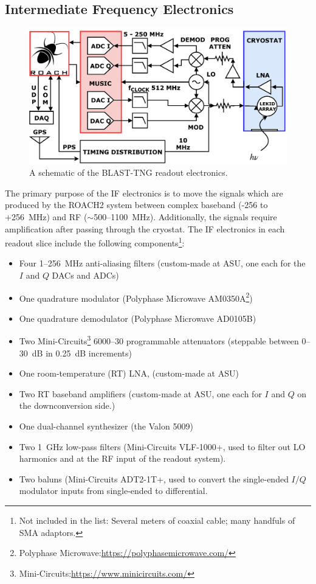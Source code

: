 \subsection{Intermediate Frequency Electronics}\label{if electronics}

\begin{figure}
\centering
\includegraphics[width=\textwidth]{figures/readout/schematics/readoutHardwareDefense}
\caption{A schematic of the BLAST-TNG readout electronics.}
\label{fig:hw schematic}
\end{figure}

The primary purpose of the IF electronics is to move the signals which are produced by the ROACH2 system between complex baseband (-256 to +256~MHz) and RF ($\sim$500--1100~MHz). Additionally, the signals require amplification after passing through the cryostat. The IF electronics in each readout slice include the following components\footnote{Not included in the list: Several meters of coaxial cable; many handfuls of SMA adaptors.}:

\begin{itemize}[nosep]
  \item Four 1--256~MHz anti-aliasing filters (custom-made at ASU, one each for the $I$ and $Q$ DACs and ADCs)
  \item One quadrature modulator (Polyphase Microwave AM0350A\footnote{Polyphase Microwave:\url{https://polyphasemicrowave.com/}})
  \item One quadrature demodulator (Polyphase Microwave AD0105B)
  \item Two Mini-Circuits\footnote{Mini-Circuits:\url{https://www.minicircuits.com/}} 6000--30 programmable attenuators (steppable between 0--30~dB in 0.25~dB increments)
  \item One room-temperature (RT) LNA, (custom-made at ASU)
  \item Two RT baseband amplifiers (custom-made at ASU, one each for $I$ and $Q$ on the downconversion side.)
  \item One dual-channel synthesizer (the Valon 5009)
  \item Two 1~GHz low-pass filters (Mini-Circuits VLF-1000+, used to filter out LO harmonics and at the RF input of the readout system).
  \item Two baluns (Mini-Circuits ADT2-1T+, used to convert the single-ended $I/Q$ modulator inputs from single-ended to differential.
\end{itemize}

